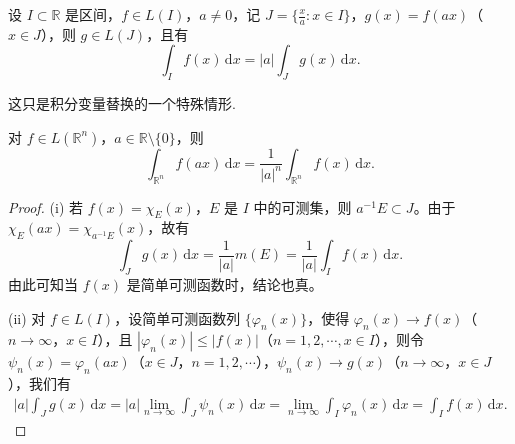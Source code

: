 \documentclass[../../main.tex]{subfiles}%
\begin{document}
\begin{proposition}
设 $I \subset \mathbb{R}$ 是区间，$f \in L(I)$，$a \neq 0$，记 $J = \{ \frac{x}{a} : x \in I \}$，$g(x) = f(ax)$（$x \in J$），则 $g \in L(J)$，且有
\[
\int_I f(x) \, \mathrm{d}x = |a| \int_J g(x) \, \mathrm{d}x.
\]

\end{proposition}
\begin{remark}
这只是积分变量替换的一个特殊情形.
\end{remark}
\begin{note}
对 $f \in L(\mathbb{R}^n)$，$a \in \mathbb{R} \setminus \{ 0 \}$，则
\[
\int_{\mathbb{R}^n} f(ax) \, \mathrm{d}x = \frac{1}{|a|^n} \int_{\mathbb{R}^n} f(x) \, \mathrm{d}x.
\]
\end{note}
\begin{proof}
(i) 若 $f(x) = \chi_E(x)$，$E$ 是 $I$ 中的可测集，则 $a^{-1}E \subset J$。由于 $\chi_E(ax) = \chi_{a^{-1}E}(x)$，故有
\[
\int_J g(x) \, \mathrm{d}x = \frac{1}{|a|} m(E) = \frac{1}{|a|} \int_I f(x) \, \mathrm{d}x.
\]
由此可知当 $f(x)$ 是简单可测函数时，结论也真。

(ii) 对 $f \in L(I)$，设简单可测函数列 $\{ \varphi_n(x) \}$，使得 $\varphi_n(x) \to f(x)$（$n \to \infty$，$x \in I$），且 $|\varphi_n(x)| \leqslant |f(x)|$（$n = 1, 2, \cdots, x \in I$），则令 $\psi_n(x) = \varphi_n(ax)$（$x \in J$，$n = 1, 2, \cdots$），$\psi_n(x) \to g(x)$（$n \to \infty$，$x \in J$），我们有
\begin{align*}
|a| \int_J g(x) \, \mathrm{d}x = |a| \lim_{n \to \infty} \int_J \psi_n(x) \, \mathrm{d}x = \lim_{n \to \infty} \int_I \varphi_n(x) \, \mathrm{d}x = \int_I f(x) \, \mathrm{d}x.
\end{align*}
\end{proof}
\end{document}
